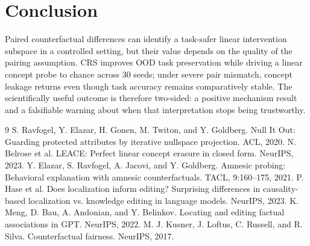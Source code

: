 \documentclass{article}
\begin{document}
\section{Conclusion}
Paired counterfactual differences can identify a task-safer linear intervention subspace in a controlled setting, but their value depends on the quality of the pairing assumption. CRS improves OOD task preservation while driving a linear concept probe to chance across 30 seeds; under severe pair mismatch, concept leakage returns even though task accuracy remains comparatively stable. The scientifically useful outcome is therefore two-sided: a positive mechanism result and a falsifiable warning about when that interpretation stops being trustworthy.

\clearpage
\begin{thebibliography}{9}
 S. Ravfogel, Y. Elazar, H. Gonen, M. Twiton, and Y. Goldberg. Null It Out: Guarding protected attributes by iterative nullspace projection. ACL, 2020.
 N. Belrose et al. LEACE: Perfect linear concept erasure in closed form. NeurIPS, 2023.
 Y. Elazar, S. Ravfogel, A. Jacovi, and Y. Goldberg. Amnesic probing: Behavioral explanation with amnesic counterfactuals. TACL, 9:160--175, 2021.
 P. Hase et al. Does localization inform editing? Surprising differences in causality-based localization vs. knowledge editing in language models. NeurIPS, 2023.
 K. Meng, D. Bau, A. Andonian, and Y. Belinkov. Locating and editing factual associations in GPT. NeurIPS, 2022.
 M. J. Kusner, J. Loftus, C. Russell, and R. Silva. Counterfactual fairness. NeurIPS, 2017.
\end{thebibliography}
\end{document}
